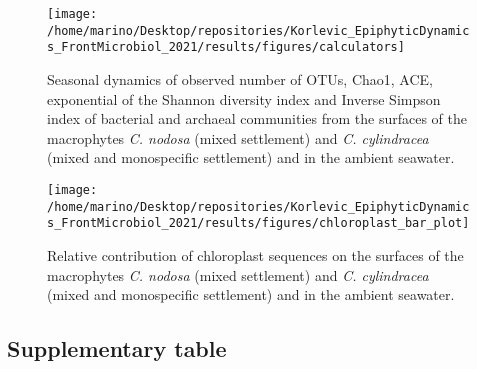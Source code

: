 \documentclass[
  12pt,
]{article}
\begin{document}
\begin{figure}[H]

{\centering \texttt{[image: /home/marino/Desktop/repositories/Korlevic\_EpiphyticDynamics\_FrontMicrobiol\_2021/results/figures/calculators]} 

}

\caption{Seasonal dynamics of observed number of OTUs, Chao1, ACE, exponential of the Shannon diversity index and Inverse Simpson index of bacterial and archaeal communities from the surfaces of the macrophytes \textit{C. nodosa} (mixed settlement) and \textit{C. cylindracea} (mixed and monospecific settlement) and in the ambient seawater.\label{calculators}}\label{fig:unnamed-chunk-2}
\end{figure}

\begin{figure}[H]

{\centering \texttt{[image: /home/marino/Desktop/repositories/Korlevic\_EpiphyticDynamics\_FrontMicrobiol\_2021/results/figures/chloroplast\_bar\_plot]} 

}

\caption{Relative contribution of chloroplast sequences on the surfaces of the macrophytes \textit{C. nodosa} (mixed settlement) and \textit{C. cylindracea} (mixed and monospecific settlement) and in the ambient seawater.\label{chloroplast}}\label{fig:unnamed-chunk-3}
\end{figure}

\hypertarget{supplementary-table}{%
\subsection{Supplementary table}\label{supplementary-table}}

\begingroup\fontsize{9}{11}\selectfont
\end{document}
